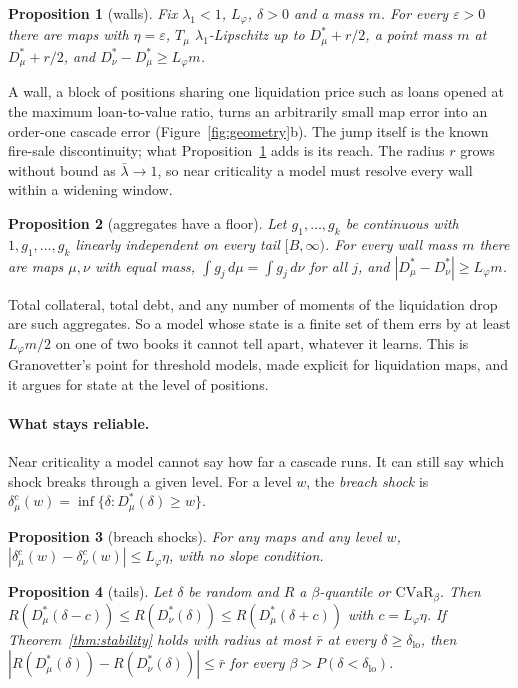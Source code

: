\documentclass[letterpaper]{article} %
\newtheorem{proposition}{Proposition}
\theoremstyle{remark}
\newcommand{\Dstar}[1]{D^{\ast}_{#1}}
\newcommand{\Lp}{L_\varphi}
\newcommand{\lb}{\bar\lambda}
\begin{document}
\begin{proposition}[walls]\label{prop:wall}
Fix $\lambda_1<1$, $\Lp$, $\delta>0$ and a mass $m$. For every $\varepsilon>0$ there are maps with $\eta=\varepsilon$, $T_\mu$ $\lambda_1$-Lipschitz up to $\Dstar{\mu}+r/2$, a point mass $m$ at $\Dstar{\mu}+r/2$, and $\Dstar{\nu}-\Dstar{\mu}\ge\Lp m$.
\end{proposition}

A wall, a block of positions sharing one liquidation price such as loans opened at the maximum loan-to-value ratio, turns an arbitrarily small map error into an order-one cascade error (Figure~\ref{fig:geometry}b). The jump itself is the known fire-sale discontinuity; what Proposition~\ref{prop:wall} adds is its reach. The radius $r$ grows without bound as $\lb\to1$, so near criticality a model must resolve every wall within a widening window.

\begin{proposition}[aggregates have a floor]\label{prop:aggregate}
Let $g_1,\dots,g_k$ be continuous with $1,g_1,\dots,g_k$ linearly independent on every tail $[B,\infty)$. For every wall mass $m$ there are maps $\mu,\nu$ with equal mass, $\int g_j\,d\mu=\int g_j\,d\nu$ for all $j$, and $|\Dstar{\mu}-\Dstar{\nu}|\ge\Lp m$.
\end{proposition}

Total collateral, total debt, and any number of moments of the liquidation drop are such aggregates. So a model whose state is a finite set of them errs by at least $\Lp m/2$ on one of two books it cannot tell apart, whatever it learns. This is Granovetter's point for threshold models, made explicit for liquidation maps, and it argues for state at the level of positions.

\paragraph{What stays reliable.} Near criticality a model cannot say how far a cascade runs. It can still say which shock breaks through a given level. For a level $w$, the \emph{breach shock} is $\delta^c_\mu(w)=\inf\{\delta:\Dstar{\mu}(\delta)\ge w\}$.

\begin{proposition}[breach shocks]\label{prop:breach}
For any maps and any level $w$, $|\delta^c_\mu(w)-\delta^c_\nu(w)|\le\Lp\eta$, with no slope condition.
\end{proposition}

\begin{proposition}[tails]\label{prop:tail}
Let $\delta$ be random and $R$ a $\beta$-quantile or $\mathrm{CVaR}_\beta$. Then $R(\Dstar{\mu}(\delta-c))\le R(\Dstar{\nu}(\delta))\le R(\Dstar{\mu}(\delta+c))$ with $c=\Lp\eta$. If Theorem~\ref{thm:stability} holds with radius at most $\bar r$ at every $\delta\ge\delta_{\mathrm{lo}}$, then $|R(\Dstar{\mu}(\delta))-R(\Dstar{\nu}(\delta))|\le\bar r$ for every $\beta>P(\delta<\delta_{\mathrm{lo}})$.
\end{proposition}
\end{document}
